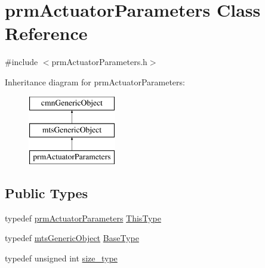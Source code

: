 \hypertarget{classprm_actuator_parameters}{\section{prm\-Actuator\-Parameters Class Reference}
\label{classprm_actuator_parameters}
}


{\ttfamily \#include $<$prm\-Actuator\-Parameters.\-h$>$}

Inheritance diagram for prm\-Actuator\-Parameters\-:\begin{figure}[H]
\begin{center}
\leavevmode
\includegraphics[height=3.000000cm]{d0/d12/classprm_actuator_parameters}
\end{center}
\end{figure}
\subsection*{Public Types}
\begin{DoxyCompactItemize}
\item 
typedef \hyperlink{classprm_actuator_parameters}{prm\-Actuator\-Parameters} \hyperlink{classprm_actuator_parameters_a589f0647003ec5c96825d45d645baa49}{This\-Type}
\item 
typedef \hyperlink{classmts_generic_object}{mts\-Generic\-Object} \hyperlink{classprm_actuator_parameters_a9e63e124dcab41543b0bdcd0a652671b}{Base\-Type}
\item 
typedef unsigned int \hyperlink{classprm_actuator_parameters_a0b8bdcb6c28e1f3028d93cf9b6ca1ee0}{size\-\_\-type}
\end{DoxyCompactItemize}
